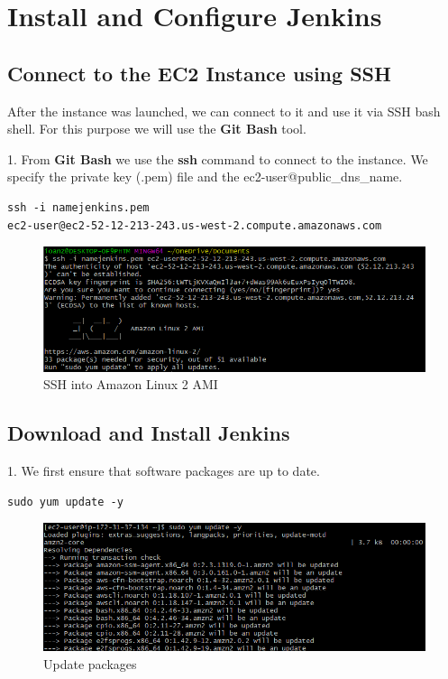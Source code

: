 \documentclass[12pt,a4paper,twoside]{article}
\begin{document}
\section{Install and Configure Jenkins}


\subsection{Connect to the EC2 Instance using SSH}


After the instance was launched, we can connect to it and use it via SSH bash shell. For this purpose we will use the \textbf{Git Bash} tool.


1. From \textbf{Git Bash} we use the \textbf{ssh} command to connect to the instance. We specify the private key (.pem) file and the ec2-user@public\_dns\_name.

\begin{verbatim}
ssh -i namejenkins.pem 
ec2-user@ec2-52-12-213-243.us-west-2.compute.amazonaws.com
\end{verbatim}

\begin{figure}[H]
    \centering
        \includegraphics[width=15cm]{images-aws/13-ssh-connect.png}
        \caption{SSH into Amazon Linux 2 AMI}
\end{figure}


\subsection{Download and Install Jenkins}


1. We first ensure that software packages are up to date.


\begin{verbatim}
sudo yum update -y
\end{verbatim}


\begin{figure}[H]
    \centering
        \includegraphics[width=15cm]{images-aws/14-yum-update.png}
        \caption{Update packages}
\end{figure}
\end{document}
